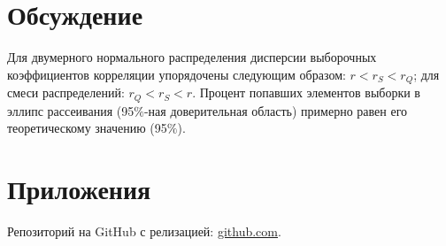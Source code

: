 \documentclass[12pt,a4paper]{scrartcl}
\begin{document}
\section{Обсуждение}
Для двумерного нормального распределения дисперсии выборочных коэффициентов корреляции упорядочены следующим образом: $r < r_{S} < r_{Q}$; для смеси распределений: $r_{Q} < r_{S} < r$.
\newline
Процент попавших элементов выборки в эллипс рассеивания (95$\%$-ная доверительная область) примерно равен его теоретическому значению (95$\%$).

\section{Приложения}
Репозиторий на GitHub с релизацией: \href{https://github.com/WiillyWonka/MatStat}{github.com}.
\end{document}
